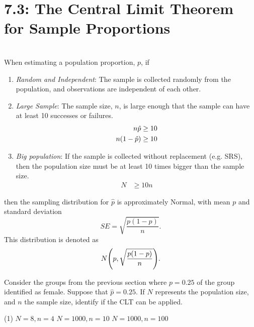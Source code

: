 \documentclass[../mathNotesPreamble]{subfiles}
\begin{document}
  \section{7.3: The Central Limit Theorem for Sample Proportions}
  \begin{defn*}\mbox{}\\
    When estimating a population proportion, $p$, if
    \begin{enumerate}
      \item \emph{Random and Independent}: The sample is collected randomly from the population, and observations are independent of each other.
      \item \emph{Large Sample}: The sample size, $n$, is large
        enough that the sample can have at least 10 successes or
        failures.
        \begin{align*}
          n\hat{p}&\geq 10\\
          n{\left(1-\hat{p}\right)}&\geq 10
        \end{align*}
      \item \emph{Big population}: If the sample is collected
        without replacement (e.g. SRS), then the population size must be at
        least 10 times bigger than the sample size.
        \begin{align*}
          N&\geq 10n
        \end{align*}
    \end{enumerate}
    then the sampling distribution for $\hat{p}$ is approximately Normal, with mean $p$ and standard deviation
      \[SE=\sqrt{\frac{p(1-p)}{n}}.\]
    This distribution is denoted as
      \[N{\left(p,\sqrt{\frac{p(1-p)}{n}}\right)}.\]
  \end{defn*}
  \pagebreak

  \begin{ex*}
    Consider the groups from the previous section where $p=0.25$ of the group identified as female. Suppose that $\hat{p}=0.25$. If $N$ represents the population size, and $n$ the sample size, identify if the CLT can be applied.
  \end{ex*}
  \begin{extasks}[after-item-skip=\stretch{1}](1)
    \task $N=8, n=4$
    \task $N=1000, n=10$
    \task $N=1000, n=100$
  \end{extasks}
  \pagebreak
\end{document}
